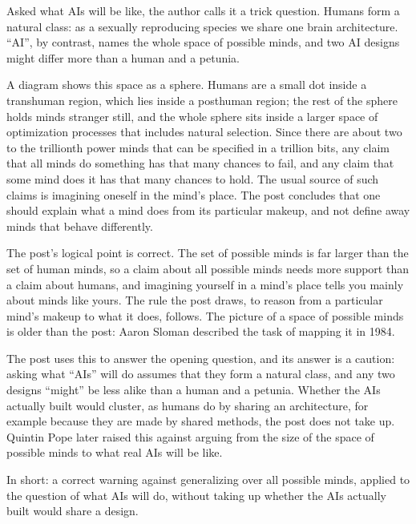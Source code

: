 \begin{afterword}
\summaryhead

Asked what AIs will be like, the author calls it a trick question. Humans form a natural class: as a sexually reproducing species we share one brain architecture. ``AI'', by contrast, names the whole space of possible minds, and two AI designs might differ more than a human and a petunia.

A diagram shows this space as a sphere. Humans are a small dot inside a transhuman region, which lies inside a posthuman region; the rest of the sphere holds minds stranger still, and the whole sphere sits inside a larger space of optimization processes that includes natural selection. Since there are about two to the trillionth power minds that can be specified in a trillion bits, any claim that all minds do something has that many chances to fail, and any claim that some mind does it has that many chances to hold. The usual source of such claims is imagining oneself in the mind's place. The post concludes that one should explain what a mind does from its particular makeup, and not define away minds that behave differently.

\responsehead

The post's logical point is correct. The set of possible minds is far larger than the set of human minds, so a claim about all possible minds needs more support than a claim about humans, and imagining yourself in a mind's place tells you mainly about minds like yours. The rule the post draws, to reason from a particular mind's makeup to what it does, follows. The picture of a space of possible minds is older than the post: Aaron Sloman described the task of mapping it in 1984.

The post uses this to answer the opening question, and its answer is a caution: asking what ``AIs'' will do assumes that they form a natural class, and any two designs ``might'' be less alike than a human and a petunia. Whether the AIs actually built would cluster, as humans do by sharing an architecture, for example because they are made by shared methods, the post does not take up. Quintin Pope later raised this against arguing from the size of the space of possible minds to what real AIs will be like.

In short: a correct warning against generalizing over all possible minds, applied to the question of what AIs will do, without taking up whether the AIs actually built would share a design.
\end{afterword}
